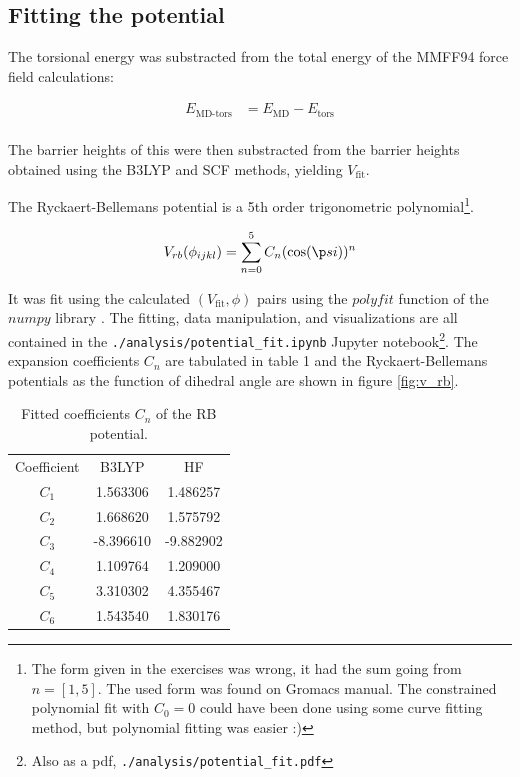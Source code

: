 \documentclass[10pt]{article}
\begin{document}
\subsection{Fitting the potential}

The torsional energy was substracted from the total energy of the MMFF94 force field calculations:

\begin{align}
E_{\text{MD-tors}} &= E_{\text{MD}} - E_{\text{tors}}\\
\end{align}

The barrier heights of this were then substracted from the barrier heights obtained using the B3LYP and SCF methods, yielding $V_{\text{fit}}$. 

The Ryckaert-Bellemans potential is a 5th order trigonometric polynomial\footnote{The form given in the exercises was wrong, it had the sum going from $n=[1,5]$. The used form was found on Gromacs manual. The constrained polynomial fit with $C_0 = 0$ could have been done using some curve fitting method, but polynomial fitting was easier :)}. 

\begin{align}
V_{rb}(\phi_{ijkl}) = \sum_{n=0}^5 C_n (\cos (\p si))^n
\end{align}

It was fit using the calculated $(V_{\text{fit}}, \phi)$ pairs using the $polyfit$ function of the $numpy$ library \cite{numpy}. The fitting, data manipulation, and visualizations are all contained in the \texttt{./analysis/potential\_fit.ipynb} Jupyter notebook\footnote{Also as a pdf, \texttt{\texttt{./analysis/potential\_fit.pdf}} }. The expansion coefficients $C_n$ are tabulated in table 1 and the Ryckaert-Bellemans  potentials as the function of dihedral angle are shown in figure \ref{fig:v_rb}.

\begin{table}[ht!]
	\centering
	\label{my-label}
	\begin{tabular}{ccc}
		Coefficient & B3LYP  &      HF       \\
		$C_1$ & 1.563306 &  1.486257 \\
		$C_2$ & 1.668620 &  1.575792 \\
		$C_3$ &-8.396610 & -9.882902 \\
		$C_4$ & 1.109764 &  1.209000 \\
		$C_5$ & 3.310302 &  4.355467 \\
		$C_6$ & 1.543540 &  1.830176
	\end{tabular}
	\caption{Fitted coefficients $C_n$ of the RB potential.}
\end{table}
\end{document}
